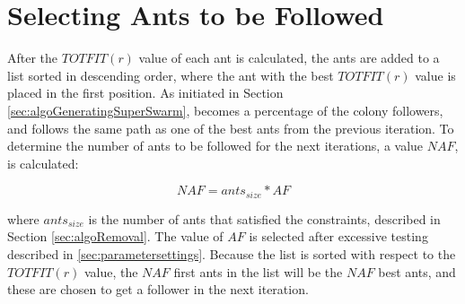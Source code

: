 \section{Selecting Ants to be Followed}
\label{sec:selctingAntsToBeFollowed}

After the $TOTFIT(r)$ value of each ant is calculated, the ants are added to a list sorted in descending order, where the ant with the best $TOTFIT(r)$ value is placed in the first position. As initiated in Section \vref{sec:algoGeneratingSuperSwarm}, becomes a percentage of the colony followers, and follows the same path as one of the best ants from the previous iteration. To determine the number of ants to be followed for the next iterations, a value $NAF$, is calculated:

$$NAF = ants_{size} * AF$$
 
where $ants_{size}$ is the number of ants that satisfied the constraints, described in Section \vref{sec:algoRemoval}. The value of $AF$ is selected after excessive testing described in \vref{sec:parametersettings}. Because the list is sorted with respect to the $TOTFIT(r)$ value, the $NAF$ first ants in the list will be the $NAF$ best ants, and these are chosen to get a follower in the next iteration.  


 